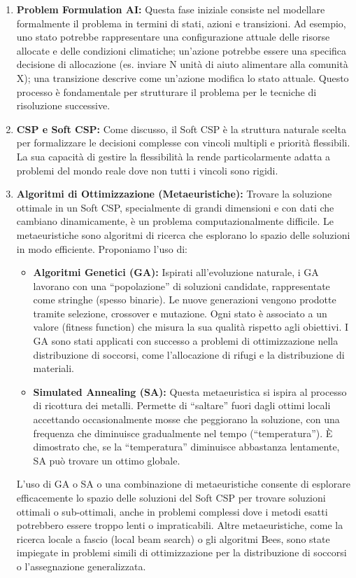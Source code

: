 \documentclass[letterpaper]{article}
\begin{document}
\begin{enumerate}
    \item \textbf{Problem Formulation AI:} Questa fase iniziale consiste nel modellare formalmente il problema in termini di stati, azioni e transizioni. Ad esempio, uno stato potrebbe rappresentare una configurazione attuale delle risorse allocate e delle condizioni climatiche; un'azione potrebbe essere una specifica decisione di allocazione (es. inviare N unità di aiuto alimentare alla comunità X); una transizione descrive come un'azione modifica lo stato attuale. Questo processo è fondamentale per strutturare il problema per le tecniche di risoluzione successive.

    \item \textbf{CSP e Soft CSP:} Come discusso, il Soft CSP è la struttura naturale scelta per formalizzare le decisioni complesse con vincoli multipli e priorità flessibili. La sua capacità di gestire la flessibilità la rende particolarmente adatta a problemi del mondo reale dove non tutti i vincoli sono rigidi.

    \item \textbf{Algoritmi di Ottimizzazione (Metaeuristiche):} Trovare la soluzione ottimale in un Soft CSP, specialmente di grandi dimensioni e con dati che cambiano dinamicamente, è un problema computazionalmente difficile. Le metaeuristiche sono algoritmi di ricerca che esplorano lo spazio delle soluzioni in modo efficiente. Proponiamo l'uso di:
          \begin{itemize}
              \item \textbf{Algoritmi Genetici (GA):} Ispirati all'evoluzione naturale, i GA lavorano con una ``popolazione'' di soluzioni candidate, rappresentate come stringhe (spesso binarie). Le nuove generazioni vengono prodotte tramite selezione, crossover e mutazione. Ogni stato è associato a un valore (fitness function) che misura la sua qualità rispetto agli obiettivi. I GA sono stati applicati con successo a problemi di ottimizzazione nella distribuzione di soccorsi, come l'allocazione di rifugi e la distribuzione di materiali.
              \item \textbf{Simulated Annealing (SA):} Questa metaeuristica si ispira al processo di ricottura dei metalli. Permette di ``saltare'' fuori dagli ottimi locali accettando occasionalmente mosse che peggiorano la soluzione, con una frequenza che diminuisce gradualmente nel tempo (``temperatura''). È dimostrato che, se la ``temperatura'' diminuisce abbastanza lentamente, SA può trovare un ottimo globale.
          \end{itemize}
          L'uso di GA o SA o una combinazione di metaeuristiche consente di esplorare efficacemente lo spazio delle soluzioni del Soft CSP per trovare soluzioni ottimali o sub-ottimali, anche in problemi complessi dove i metodi esatti potrebbero essere troppo lenti o impraticabili. Altre metaeuristiche, come la ricerca locale a fascio (local beam search) o gli algoritmi Bees, sono state impiegate in problemi simili di ottimizzazione per la distribuzione di soccorsi o l'assegnazione generalizzata.


\end{enumerate}
\end{document}
